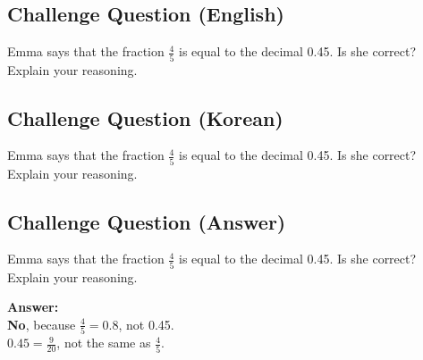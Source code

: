 \cleardoublepage
\subsection*{Challenge Question (English)}
Emma says that the fraction $\frac{4}{5}$ is equal to the decimal 0.45. Is she correct? Explain your reasoning.


\newpage
\subsection*{Challenge Question (Korean)}
Emma says that the fraction $\frac{4}{5}$ is equal to the decimal 0.45. Is she correct? Explain your reasoning.


\newpage
\subsection*{Challenge Question (Answer)}
Emma says that the fraction $\frac{4}{5}$ is equal to the decimal 0.45. Is she correct? Explain your reasoning.

\textbf{Answer:}\\
\textbf{No}, because $\frac{4}{5} = 0.8$, not 0.45.\\
$0.45 = \frac{9}{20}$, not the same as $\frac{4}{5}$.
